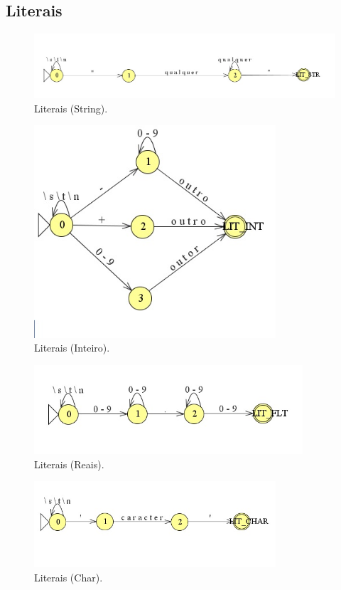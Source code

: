 \documentclass{article}
\begin{document}
\subsection{Literais}

\begin{figure}[!h]
\centering
\includegraphics[width=12cm]{DT_LIT_STR.jpg}
\caption{Literais (String).}
\label{fig:CL_logo}\end{figure}

\pagebreak

\begin{figure}[!h]
\centering
\includegraphics[width=9cm]{DT_LIT_INT.jpg}
\caption{Literais (Inteiro).}
\label{fig:CL_logo}\end{figure}

\begin{figure}[!h]
\centering
\includegraphics[width=10cm]{DT_LIT_FLT.jpg}
\caption{Literais (Reais).}
\label{fig:CL_logo}\end{figure}

\pagebreak

\begin{figure}[!h]
\centering
\includegraphics[width=9cm]{DT_LIT_CHAR.jpg}
\caption{Literais (Char).}
\label{fig:CL_logo}\end{figure}
\end{document}
